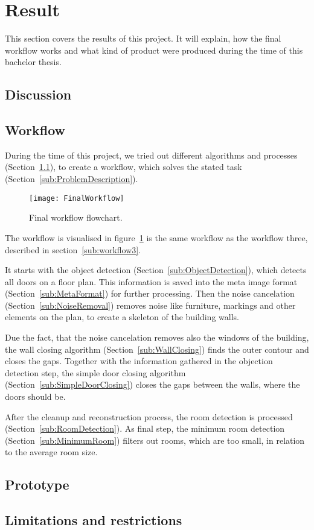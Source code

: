 \section{Result}
This section covers the results of this project. It will explain, how the final workflow works and what kind of product were produced during the time of this bachelor thesis.

\subsection{Discussion}
\label{sub:Discussion}

\subsection{Workflow}
During the time of this project, we tried out different algorithms and processes (Section~\ref{sub:Discussion}), to create a workflow, which solves the stated task (Section~\ref{sub:ProblemDescription}).

\begin{figure}[H]
	\centering
	\texttt{[image: FinalWorkflow]}
	\caption{Final workflow flowchart.}
	\label{fig:FinalWorkflow}
\end{figure}

The workflow is visualised in figure~\ref{fig:FinalWorkflow} is the same workflow as the workflow three, described in section~\ref{sub:workflow3}.

It starts with the object detection (Section~\ref{sub:ObjectDetection}), which detects all doors on a floor plan. This information is saved into the meta image format (Section~\ref{sub:MetaFormat}) for further processing. Then the noise cancelation (Section~\ref{sub:NoiseRemoval}) removes noise like furniture, markings and other elements on the plan, to create a skeleton of the building walls.

Due the fact, that the noise cancelation removes also the windows of the building, the wall closing algorithm (Section~\ref{sub:WallClosing}) finds the outer contour and closes the gaps. Together with the information gathered in the objection detection step, the simple door closing algorithm (Section~\ref{sub:SimpleDoorClosing}) closes the gaps between the walls, where the doors should be.

After the cleanup and reconstruction process, the room detection is processed (Section~\ref{sub:RoomDetection}). As final step, the minimum room detection (Section~\ref{sub:MinimumRoom}) filters out rooms, which are too small, in relation to the average room size.


\subsection{Prototype}

\subsection{Limitations and restrictions}